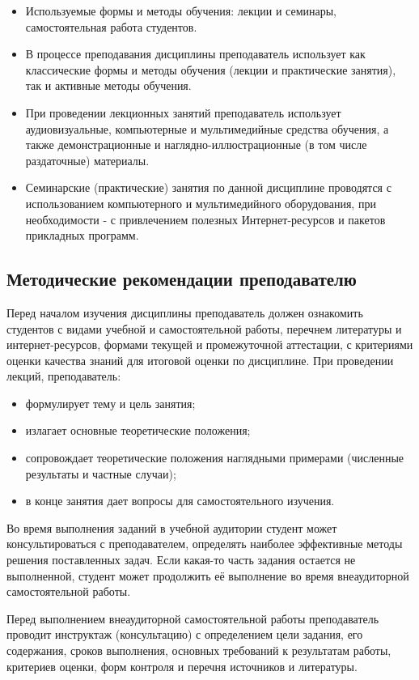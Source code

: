 \documentclass[a4paper, 12pt]{article}
\begin{document}
\begin{itemize}
    \item Используемые формы и методы обучения: лекции и семинары, самостоятельная работа студентов.
    \item В процессе преподавания дисциплины преподаватель использует как классические формы и методы обучения (лекции и практические занятия), так и активные методы обучения. 
    \item При проведении лекционных занятий преподаватель использует аудиовизуальные, компьютерные и мультимедийные средства обучения, а также демонстрационные и наглядно-иллюстрационные (в том числе раздаточные) материалы.
    \item Семинарские (практические) занятия по данной дисциплине проводятся с использованием компьютерного и мультимедийного оборудования, при необходимости - с привлечением полезных Интернет-ресурсов и пакетов прикладных программ. 
\end{itemize}

\subsection{Методические рекомендации преподавателю}

Перед началом изучения дисциплины преподаватель должен ознакомить студентов с видами учебной и самостоятельной работы, перечнем литературы и интернет-ресурсов, формами текущей и промежуточной аттестации, с критериями оценки качества знаний для итоговой оценки по дисциплине. 
При проведении лекций, преподаватель:
\begin{itemize}[noitemsep,topsep=0pt]
    \item формулирует тему и цель занятия;
    \item излагает основные теоретические положения;
    \item сопровождает теоретические положения наглядными примерами (численные результаты и частные случаи);
    \item в конце занятия дает вопросы для самостоятельного изучения.
\end{itemize}

Во время выполнения заданий в учебной аудитории студент может консультироваться с преподавателем, определять наиболее эффективные методы решения поставленных задач. Если какая-то часть задания остается не выполненной, студент может продолжить её выполнение во время внеаудиторной самостоятельной работы.

Перед выполнением внеаудиторной самостоятельной работы преподаватель проводит инструктаж (консультацию) с определением цели задания, его содержания, сроков выполнения, основных требований к результатам работы, критериев оценки, форм контроля и перечня источников и литературы.
\end{document}
